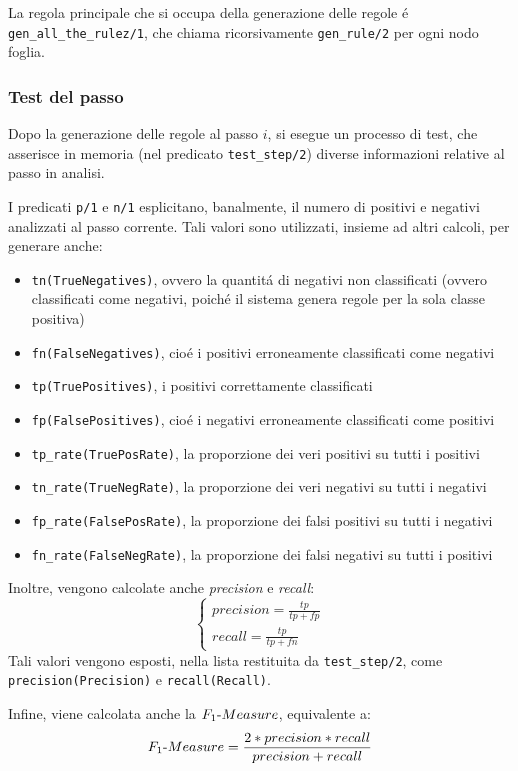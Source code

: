 \documentclass[preprint]{acm_proc_article-sp}
\begin{document}
La regola principale che si occupa della generazione delle regole \'e \verb|gen_all_the_rulez/1|, che chiama ricorsivamente \verb|gen_rule/2| per ogni nodo foglia.

\subsubsection{Test del passo}\label{test-step}
Dopo la generazione delle regole al passo $i$, si esegue un processo di test, che asserisce in memoria (nel predicato \verb|test_step/2|) diverse informazioni relative al passo in analisi.

I predicati \verb|p/1| e \verb|n/1| esplicitano, banalmente, il numero di positivi e negativi analizzati al passo corrente. Tali valori sono utilizzati, insieme ad altri calcoli, per generare anche:
\begin{itemize}
\item \verb|tn(TrueNegatives)|, ovvero la quantit\'a di negativi non classificati (ovvero classificati come negativi, poich\'e il sistema genera regole per la sola classe positiva)
\item \verb|fn(FalseNegatives)|, cio\'e i positivi erroneamente classificati come negativi
\item \verb|tp(TruePositives)|, i positivi correttamente classificati
\item \verb|fp(FalsePositives)|, cio\'e i negativi erroneamente classificati come positivi
\item \verb|tp_rate(TruePosRate)|, la proporzione dei veri positivi su tutti i positivi
\item \verb|tn_rate(TrueNegRate)|, la proporzione dei veri negativi su tutti i negativi
\item \verb|fp_rate(FalsePosRate)|, la proporzione dei falsi positivi su tutti i negativi
\item \verb|fn_rate(FalseNegRate)|, la proporzione dei falsi negativi su tutti i positivi
\end{itemize}

Inoltre, vengono calcolate anche \textit{precision} e \textit{recall}:
\[
\begin{cases}
precision = \frac{tp}{tp+fp} \\
recall = \frac{tp}{tp+fn}
\end{cases}
\]
Tali valori vengono esposti, nella lista restituita da \verb|test_step/2|, come \verb|precision(Precision)| e \verb|recall(Recall)|.

Infine, viene calcolata anche la $F_1\textnormal{-}Measure$, equivalente a:
\[ F_1\textnormal{-}Measure = \frac{2*precision*recall}{precision+recall} \]
\end{document}
